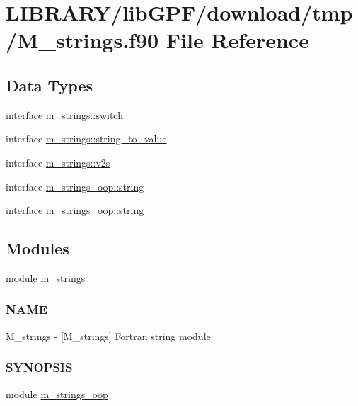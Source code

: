 \hypertarget{M__strings_8f90}{}\section{L\+I\+B\+R\+A\+R\+Y/lib\+G\+P\+F/download/tmp/\+M\+\_\+strings.f90 File Reference}
\label{M__strings_8f90}
\subsection*{Data Types}
\begin{DoxyCompactItemize}
\item 
interface \hyperlink{interfacem__strings_1_1switch}{m\+\_\+strings\+::switch}
\item 
interface \hyperlink{interfacem__strings_1_1string__to__value}{m\+\_\+strings\+::string\+\_\+to\+\_\+value}
\item 
interface \hyperlink{interfacem__strings_1_1v2s}{m\+\_\+strings\+::v2s}
\item 
interface \hyperlink{structm__strings__oop_1_1string}{m\+\_\+strings\+\_\+oop\+::string}
\item 
interface \hyperlink{structm__strings__oop_1_1string}{m\+\_\+strings\+\_\+oop\+::string}
\end{DoxyCompactItemize}
\subsection*{Modules}
\begin{DoxyCompactItemize}
\item 
module \hyperlink{namespacem__strings}{m\+\_\+strings}
\begin{DoxyCompactList}\small\item\em \subsubsection*{N\+A\+ME}

M\+\_\+strings -\/ \mbox{[}M\+\_\+strings\mbox{]} Fortran string module \subsubsection*{S\+Y\+N\+O\+P\+S\+IS}\end{DoxyCompactList}\item 
module \hyperlink{namespacem__strings__oop}{m\+\_\+strings\+\_\+oop}
\end{DoxyCompactItemize}
